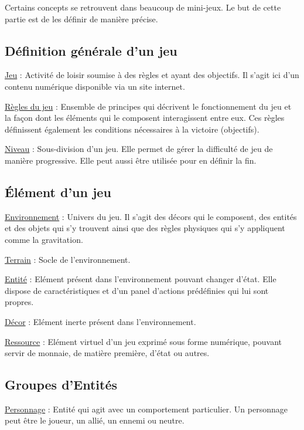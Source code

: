 Certains concepts se retrouvent dans beaucoup de mini-jeux. Le but de cette partie est de les définir de manière précise.

\subsection*{Définition générale d'un jeu}

\underline{Jeu} : 
Activité de loisir soumise à des règles et ayant des objectifs. Il s'agit ici d'un contenu numérique
 disponible via un site internet.

\underline{Règles du jeu} : 
Ensemble de principes qui décrivent le fonctionnement du jeu et 
la façon dont les éléments qui le composent interagissent entre eux. 
Ces règles définissent également les conditions nécessaires à la victoire (objectifs).

\underline{Niveau} :
Sous-division d'un jeu. Elle permet de gérer la difficulté de jeu de manière progressive. Elle peut aussi être utilisée pour en définir la fin. 

\subsection*{Élément d'un jeu}

\underline{Environnement} : 
Univers du jeu. Il s'agit des décors qui le composent, des entités et des objets qui s'y trouvent ainsi que 
des règles physiques qui s'y appliquent comme la gravitation.

\underline{Terrain} : 
Socle de l'environnement.

\underline{Entité} : 
Elément présent dans l'environnement pouvant changer d'état. 
Elle dispose de caractéristiques et d'un panel d'actions prédéfinies qui lui sont propres.

\underline{Décor} : 
Elément inerte présent dans l'environnement.

\underline{Ressource} : 
Elément virtuel d'un jeu exprimé sous forme numérique, pouvant servir de monnaie, de matière première, d'état ou autres.

\subsection*{Groupes d'Entités}

\underline{Personnage} :
Entité qui agit avec un comportement particulier. Un personnage peut être le joueur, un allié, un ennemi ou neutre.

